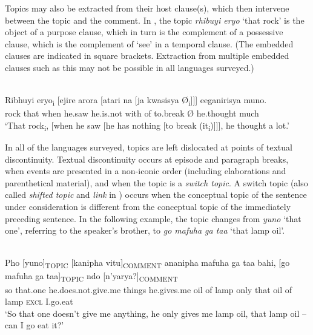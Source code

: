 \documentclass[output=paper]{langsci/langscibook}
\begin{document}
Topics may also be extracted from their host clause(s), which then intervene between the topic and the comment. In , the topic \textit{rhibuyi eryo} ‘that rock’ is the object of a purpose clause, which in turn is the complement of a possessive clause, which is the complement of ‘see’ in a temporal clause. (The embedded clauses are indicated in square brackets. Extraction from multiple embedded clauses such as this may not be possible in all languages surveyed.)

\ea\label{ex:6.nicolle}
\\
\gll Ribhuyi eryo\textsubscript{i} [ejire arora [atari na [ja kwasisya Ø\textsubscript{i}]]] eeganirisya muno.\\
rock that {\db}when he.saw he.is.not with {\db}of to.break Ø he.thought much\\
\glt ‘\textup{That rock}\textsubscript{i}\textup{, [when he saw [he has nothing [to break (it}\textsubscript{i}\textup{)]]], he thought a}\textup{ lot.’}
\z

In all of the languages surveyed, topics are left dislocated at points of textual discontinuity. Textual discontinuity occurs at episode and paragraph breaks, when events are presented in a non-iconic order (including elaborations and parenthetical material), and when the topic is a \textit{switch topic}. A switch topic (also called \textit{shifted topic} and \textit{link} in \citealt[109--110]{vallduvi1992}) occurs when the conceptual topic of the sentence under consideration is different from the conceptual topic of the immediately preceding sentence. In the following example, the topic changes from \textit{yuno} ‘that one’, referring to the speaker’s brother, to \textit{go mafuha ga taa} ‘that lamp oil’.

\ea\label{ex:7.nicolle}
\\
\gll Pho [yuno]\textsubscript{TOPIC} [kanipha vitu]\textsubscript{COMMENT} ananipha mafuha ga taa bahi, [go mafuha ga taa]\textsubscript{TOPIC} ndo [n’yarya?]\textsubscript{COMMENT}\\
so {\db}that.one {\db}he.does.not.give.me things he.gives.me oil of lamp only {\db}that oil of lamp \textsc{excl} {\db}I.go.eat\\
\glt \textup{‘So t}\textup{hat one doesn’t give me anything, he only gives me lamp oil, that lamp oil -- can I g}\textup{o eat it?’}
\z
\end{document}
